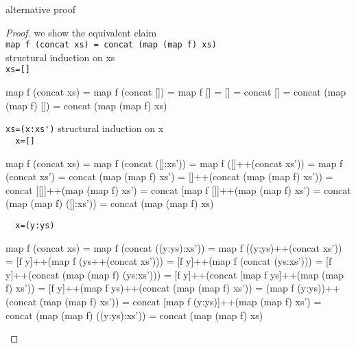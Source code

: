 \newpage
alternative proof
\begin{proof} we show the equivalent claim \\
\verb|map f (concat xs) = concat (map (map f) xs)|\\
structural induction on xs\\
\verb|xs=[]|
\begin{code}
map f (concat xs) = map f (concat [])
                  = map f []
                  = []
                  = concat []
                  = concat (map (map f) [])
                  = concat (map (map f) xs)
\end{code}
\verb|xs=(x:xs')|
structural induction on x\\
\verb|  x=[]|
\begin{code}
map f (concat xs) = map f (concat ([]:xs'))
                  = map f ([]++(concat xs'))
                  = map f (concat xs')
                  = concat (map (map f) xs')
                  = []++(concat (map (map f) xs'))
                  = concat [[]]++(map (map f) xs')
                  = concat [map f []]++(map (map f) xs')
                  = concat (map (map f) ([]:xs'))
                  = concat (map (map f) xs)
\end{code}
\verb|  x=(y:ys)|
\begin{code}
map f (concat xs) = map f (concat ((y:ys):xs'))
                  = map f ((y:ys)++(concat xs'))
                  = [f y]++(map f (ys++(concat xs')))
                  = [f y]++(map f (concat (ys:xs')))
                  = [f y]++(concat (map (map f) (ys:xs')))
                  = [f y]++(concat [map f ys]++(map (map f) xs'))
                  = [f y]++(map f ys)++(concat (map (map f) xs'))
                  = (map f (y:ys))++(concat (map (map f) xs'))
                  = concat [map f (y:ys)]++(map (map f) xs')
                  = concat (map (map f) ((y:ys):xs'))
                  = concat (map (map f) xs)
\end{code}
\end{proof}